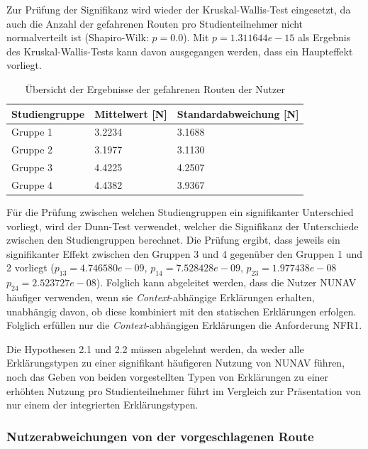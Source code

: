 Zur Prüfung der Signifikanz wird wieder der Kruskal-Wallis-Test eingesetzt, da auch die Anzahl der gefahrenen Routen pro Studienteilnehmer nicht normalverteilt ist (Shapiro-Wilk: $ p = 0.0 $). Mit $ p = 1.311644e-15 $ als Ergebnis des Kruskal-Wallis-Tests kann davon ausgegangen werden, dass ein Haupteffekt vorliegt.

\begin{table}[htb!]
    \centering
    \begin{tabular}{p{}p{}p{}}
        \hline
        Studiengruppe  & Mittelwert [N] & Standardabweichung [N] \\
        \toprule
        Gruppe 1                & 3.2234 & 3.1688 \\
        Gruppe 2                & 3.1977 & 3.1130 \\
        Gruppe 3                & 4.4225 & 4.2507 \\
        Gruppe 4                & 4.4382 & 3.9367 \\
        \bottomrule
    \end{tabular}
    \caption{Übersicht der Ergebnisse der gefahrenen Routen der Nutzer}
    \label{tab:study_usage_results}
\end{table}

Für die Prüfung zwischen welchen Studiengruppen ein signifikanter Unterschied vorliegt, wird der Dunn-Test \cite{dunn1964multiple} verwendet, welcher die Signifikanz der Unterschiede zwischen den Studiengruppen berechnet. Die Prüfung ergibt, dass jeweils ein signifikanter Effekt zwischen den Gruppen 3 und 4 gegenüber den Gruppen 1 und 2 vorliegt ($ p_{13} = 4.746580e-09 $, $ p_{14} = 7.528428e-09 $, $ p_{23} = 1.977438e-08 $ $ p_{24} = 2.523727e-08 $). Folglich kann abgeleitet werden, dass die Nutzer NUNAV häufiger verwenden, wenn sie \textit{Context}-abhängige Erklärungen erhalten, unabhängig davon, ob diese kombiniert mit den statischen Erklärungen erfolgen. Folglich erfüllen nur die \textit{Context}-abhängigen Erklärungen die Anforderung NFR1.

Die Hypothesen 2.1 und 2.2 müssen abgelehnt werden, da weder alle Erklärungstypen zu einer signifikant häufigeren Nutzung von NUNAV führen, noch das Geben von beiden vorgestellten Typen von Erklärungen zu einer erhöhten Nutzung pro Studienteilnehmer führt im Vergleich zur Präsentation von nur einem der integrierten Erklärungstypen. 

\subsubsection{Nutzerabweichungen von der vorgeschlagenen Route}

